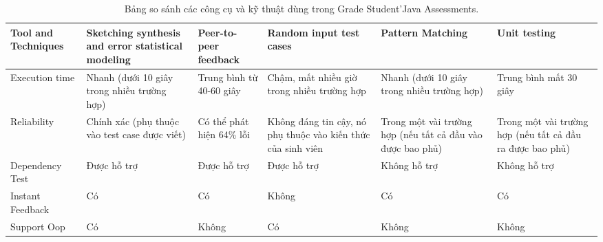 \documentclass[12pt,a4paper]{article}
\begin{document}
\begin{table}[ht]
	\centering
\begin{tabular}{|m{2.5cm}||m{2.5cm}||m{2.5cm}||m{2.5cm}||m{2.5cm}||m{2.5cm}|}
\hline 
Tool and Techniques & Sketching synthesis and error statistical modeling & Peer-to-peer feedback & Random input test cases & Pattern Matching & Unit testing\\ 
\hline 
Execution time & Nhanh (dưới 10 giây trong nhiều trường hợp) & Trung bình từ 40-60 giây & Chậm, mất nhiều giờ trong nhiều trường hợp & Nhanh (dưới 10 giây trong nhiều trường hợp) & Trung bình mất 30 giây\\ 
\hline 
Reliability & Chính xác (phụ thuộc vào test case được viết) & Có thể phát hiện 64\% lỗi & Không đáng tin cậy, nó phụ thuộc vào kiến thức của sinh viên & Trong một vài trường hợp (nếu tất cả đầu vào được bao phủ) & Trong một vài trường hợp (nếu tất cả đầu ra được bao phủ)\\
\hline
Dependency Test & Được hỗ trợ & Được hỗ trợ & Được hỗ trợ & Không hỗ trợ & Không hỗ trợ\\
\hline
Instant Feedback & Có & Có & Không & Có & Có\\
\hline
Support Oop & Có & Không & Có & Không & Không\\
\hline
\end{tabular}
\caption{Bảng so sánh các công cụ và kỹ thuật dùng trong Grade Student’Java Assessments.}
\end{table}
\end{document}
